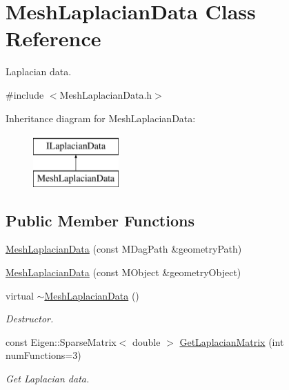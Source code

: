 \hypertarget{class_mesh_laplacian_data}{\section{Mesh\+Laplacian\+Data Class Reference}
\label{class_mesh_laplacian_data}
}


Laplacian data.  




{\ttfamily \#include $<$Mesh\+Laplacian\+Data.\+h$>$}

Inheritance diagram for Mesh\+Laplacian\+Data\+:\begin{figure}[H]
\begin{center}
\leavevmode
\includegraphics[height=2.000000cm]{class_mesh_laplacian_data}
\end{center}
\end{figure}
\subsection*{Public Member Functions}
\begin{DoxyCompactItemize}
\item 
\hyperlink{class_mesh_laplacian_data_a5f57380117063fed3c758070836deed8}{Mesh\+Laplacian\+Data} (const M\+Dag\+Path \&geometry\+Path)
\item 
\hyperlink{class_mesh_laplacian_data_a0baa5e645b1f92cbd77094d9e8fe371b}{Mesh\+Laplacian\+Data} (const M\+Object \&geometry\+Object)
\item 
\hypertarget{class_mesh_laplacian_data_a226a9e35ed02adcc11ea372bdaa5da1a}{virtual \hyperlink{class_mesh_laplacian_data_a226a9e35ed02adcc11ea372bdaa5da1a}{$\sim$\+Mesh\+Laplacian\+Data} ()}\label{class_mesh_laplacian_data_a226a9e35ed02adcc11ea372bdaa5da1a}

\begin{DoxyCompactList}\small\item\em Destructor. \end{DoxyCompactList}\item 
const Eigen\+::\+Sparse\+Matrix$<$ double $>$ \hyperlink{class_mesh_laplacian_data_a9efe80838593c46fac7baa77ef506559}{Get\+Laplacian\+Matrix} (int num\+Functions=3)
\begin{DoxyCompactList}\small\item\em Get Laplacian data. \end{DoxyCompactList}\end{DoxyCompactItemize}
